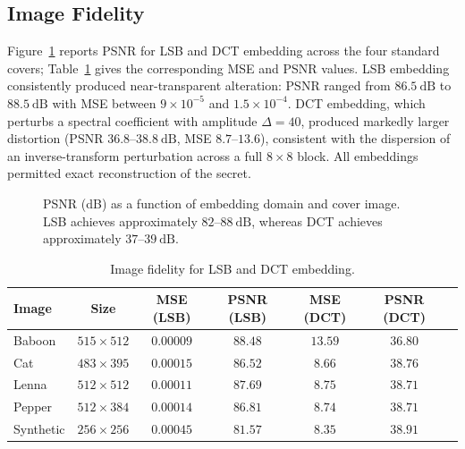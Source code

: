\documentclass[preprint,12pt,number]{elsarticle}
\begin{document}
\subsection{Image Fidelity}

Figure~\ref{fig:psnr} reports PSNR for LSB and DCT embedding across the four
standard covers; Table~\ref{tab:fidelity} gives the corresponding MSE and PSNR
values. LSB embedding consistently produced near-transparent alteration: PSNR
ranged from $86.5~\mathrm{dB}$ to $88.5~\mathrm{dB}$ with MSE between
$9\times10^{-5}$ and $1.5\times10^{-4}$. DCT embedding, which perturbs a
spectral coefficient with amplitude $\Delta = 40$, produced markedly larger
distortion (PSNR $36.8$--$38.8~\mathrm{dB}$, MSE $8.7$--$13.6$), consistent
with the dispersion of an inverse-transform perturbation across a full
$8\times8$ block. All embeddings permitted exact reconstruction of the secret.

\begin{figure}[t]
\centering
{}
\caption{PSNR (dB) as a function of embedding domain and cover image. LSB
achieves approximately $82$--$88~\mathrm{dB}$, whereas DCT achieves
approximately $37$--$39~\mathrm{dB}$.}
\label{fig:psnr}
\end{figure}

\begin{table}[t]
\centering
\small
\setlength{\tabcolsep}{4pt}
\caption{Image fidelity for LSB and DCT embedding.}
\label{tab:fidelity}
\begin{tabular}{lcccccc}
\toprule
Image & Size & MSE (LSB) & PSNR (LSB) & MSE (DCT) & PSNR (DCT)\\
\midrule
Baboon   & $515\times512$ & $0.00009$ & $88.48$ & $13.59$ & $36.80$\\
Cat      & $483\times395$ & $0.00015$ & $86.52$ & $8.66$  & $38.76$\\
Lenna    & $512\times512$ & $0.00011$ & $87.69$ & $8.75$  & $38.71$\\
Pepper   & $512\times384$ & $0.00014$ & $86.81$ & $8.74$  & $38.71$\\
Synthetic& $256\times256$ & $0.00045$ & $81.57$ & $8.35$  & $38.91$\\
\bottomrule
\end{tabular}
\end{table}
\end{document}
